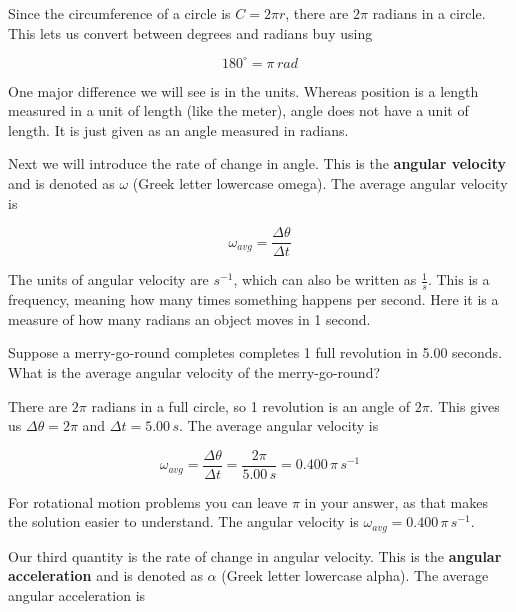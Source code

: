 \documentclass[12pt]{book}
\begin{document}
Since the circumference of a circle is $C = 2 \pi r$, there are $2 \pi$ radians in a circle. This lets us convert between degrees and radians buy using

\begin{equation}
180^{\circ} = \pi \, rad
\end{equation}

One major difference we will see is in the units. Whereas position is a length measured in a unit of length (like the meter), angle does not have a unit of length. It is just given as an angle measured in radians.

Next we will introduce the rate of change in angle. This is the \textbf{angular velocity} and is denoted as $\omega$ (Greek letter lowercase omega). The average angular velocity is

\begin{equation}
\omega_{avg} = \frac{\Delta \theta}{\Delta t}
\end{equation}

The units of angular velocity are $s^{-1}$, which can also be written as $\frac{1}{s}$. This is a frequency, meaning how many times something happens per second. Here it is a measure of how many radians an object moves in 1 second.

\begin{exampleblock}

Suppose a merry-go-round completes completes 1 full revolution in 5.00 seconds. What is the average angular velocity of the merry-go-round?

\hspace{10pt}

There are $2 \pi$ radians in a full circle, so 1 revolution is an angle of $2 \pi$. This gives us $\Delta \theta = 2 \pi$ and $\Delta t = 5.00 \, s$. The average angular velocity is

\begin{equation}
\omega_{avg} = \frac{\Delta \theta}{\Delta t} = \frac{2 \pi}{5.00 \, s} = 0.400 \, \pi \, s^{-1}
\end{equation}

For rotational motion problems you can leave $\pi$ in your answer, as that makes the solution easier to understand. The angular velocity is $\omega_{avg} = 0.400 \, \pi \, s^{-1}$.

\end{exampleblock}

Our third quantity is the rate of change in angular velocity. This is the \textbf{angular acceleration} and is denoted as $\alpha$ (Greek letter lowercase alpha). The average angular acceleration is 
\end{document}
